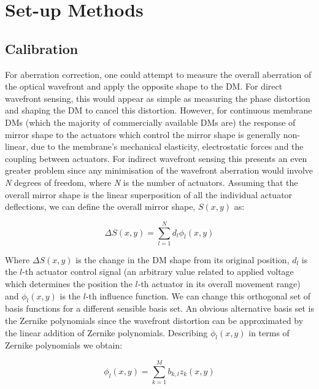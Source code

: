\section{Set-up Methods}

\subsection{Calibration}

For aberration correction, one could attempt to measure the overall aberration of the optical wavefront and apply the opposite shape to the DM. For direct wavefront sensing, this would appear as simple as measuring the phase distortion and shaping the DM to cancel this distortion. However, for continuous membrane DMs (which the majority of commercially available DMs are) the response of mirror shape to the actuators which control the mirror shape is generally non-linear, due to the membrane's mechanical elasticity, electrostatic forces and the coupling between actuators.\cite{Zhu:99} For indirect wavefront sensing this presents an even greater problem since any minimisation of the wavefront aberration would involve \textit{N} degrees of freedom, where \textit{N} is the number of actuators. Assuming that the overall mirror shape is the linear superposition of all the individual actuator deflections, we can define the overall mirror shape, $S(x,y)$ as:

\begin{equation}\label{eq:surface_shape}
\Delta S(x,y) = \sum_{l=1}^{N} d_{l}\phi_{l}(x,y)
\end{equation}

Where $\Delta S(x,y)$ is the change in the DM shape from its original position, $d_l$ is the $l$-th actuator control signal (an arbitrary value related to applied voltage which determines the position the $l$-th actuator in its overall movement range)	and $\phi_{l}(x,y)$ is the $l$-th influence function. We can change this orthogonal set of basis functions for a different sensible basis set. An obvious alternative basis set is the Zernike polynomials since the wavefront distortion can be approximated by the linear addition of Zernike polynomials.\cite{von1934beugungstheorie,noll1976zernike} Describing $\phi_{l}(x,y)$ in terms of Zernike polynomials we obtain:

\begin{equation}\label{eq:influence_to_zernike}
\phi_{l}(x,y) = \sum_{k=1}^{M} b_{k,l}z_{k}(x,y)
\end{equation}

